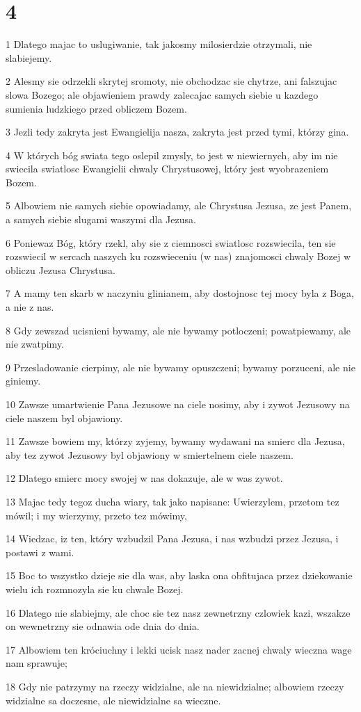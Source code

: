 \chapter{4}

\par 1 Dlatego majac to uslugiwanie, tak jakosmy milosierdzie otrzymali, nie slabiejemy.
\par 2 Alesmy sie odrzekli skrytej sromoty, nie obchodzac sie chytrze, ani falszujac slowa Bozego; ale objawieniem prawdy zalecajac samych siebie u kazdego sumienia ludzkiego przed obliczem Bozem.
\par 3 Jezli tedy zakryta jest Ewangielija nasza, zakryta jest przed tymi, którzy gina.
\par 4 W których bóg swiata tego oslepil zmysly, to jest w niewiernych, aby im nie swiecila swiatlosc Ewangielii chwaly Chrystusowej, który jest wyobrazeniem Bozem.
\par 5 Albowiem nie samych siebie opowiadamy, ale Chrystusa Jezusa, ze jest Panem, a samych siebie slugami waszymi dla Jezusa.
\par 6 Poniewaz Bóg, który rzekl, aby sie z ciemnosci swiatlosc rozswiecila, ten sie rozswiecil w sercach naszych ku rozswieceniu (w nas) znajomosci chwaly Bozej w obliczu Jezusa Chrystusa.
\par 7 A mamy ten skarb w naczyniu glinianem, aby dostojnosc tej mocy byla z Boga, a nie z nas.
\par 8 Gdy zewszad ucisnieni bywamy, ale nie bywamy potloczeni; powatpiewamy, ale nie zwatpimy.
\par 9 Przesladowanie cierpimy, ale nie bywamy opuszczeni; bywamy porzuceni, ale nie giniemy.
\par 10 Zawsze umartwienie Pana Jezusowe na ciele nosimy, aby i zywot Jezusowy na ciele naszem byl objawiony.
\par 11 Zawsze bowiem my, którzy zyjemy, bywamy wydawani na smierc dla Jezusa, aby tez zywot Jezusowy byl objawiony w smiertelnem ciele naszem.
\par 12 Dlatego smierc mocy swojej w nas dokazuje, ale w was zywot.
\par 13 Majac tedy tegoz ducha wiary, tak jako napisane: Uwierzylem, przetom tez mówil; i my wierzymy, przeto tez mówimy,
\par 14 Wiedzac, iz ten, który wzbudzil Pana Jezusa, i nas wzbudzi przez Jezusa, i postawi z wami.
\par 15 Boc to wszystko dzieje sie dla was, aby laska ona obfitujaca przez dziekowanie wielu ich rozmnozyla sie ku chwale Bozej.
\par 16 Dlatego nie slabiejmy, ale choc sie tez nasz zewnetrzny czlowiek kazi, wszakze on wewnetrzny sie odnawia ode dnia do dnia.
\par 17 Albowiem ten króciuchny i lekki ucisk nasz nader zacnej chwaly wieczna wage nam sprawuje;
\par 18 Gdy nie patrzymy na rzeczy widzialne, ale na niewidzialne; albowiem rzeczy widzialne sa doczesne, ale niewidzialne sa wieczne.

